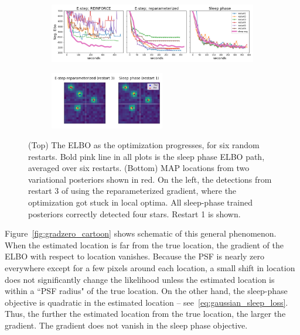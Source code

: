 \begin{figure}[!htb]
    \centering
    \begin{subfigure}[t]{0.9\textwidth}
    \centering
    \includegraphics[width=\textwidth]{figures/optim_path_compare.png}
    \end{subfigure}
    \begin{subfigure}[t]{\textwidth}
    \centering
    \includegraphics[width=0.55\textwidth]{figures/optim_path_detect_compare.png}
    \end{subfigure}
    \vspace{-3em}
    \caption{(Top) The ELBO as the optimization progresses, for six random restarts. Bold pink line in all plots is the sleep phase ELBO path, averaged over six restarts. (Bottom) MAP locations from two variational posteriors shown in red. On the left, the detections from restart 3 of using the reparameterized gradient, where the optimization got stuck in local optima. All sleep-phase trained posteriors correctly detected four stars. Restart 1 is shown. }
    \label{fig:optim_path}
\end{figure}

Figure~\ref{fig:gradzero_cartoon} shows schematic of this general phenomenon. When the estimated location is far from the true location, the gradient of the ELBO with respect to location vanishes. Because the PSF is nearly zero everywhere except for a few pixels around each location, a small shift in location does not significantly change the likelihood unless the estimated location is within a ``PSF radius" of the true location. On the other hand, the sleep-phase objective is quadratic in the estimated location -- see~\eqref{eq:gaussian_sleep_loss}. Thus, the further the estimated location from the true location, the larger the gradient. The gradient does not vanish in the sleep phase objective. 

